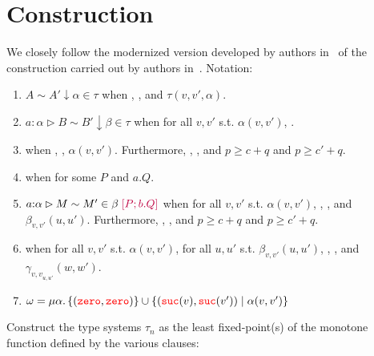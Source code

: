 
\section{Construction}

We closely follow the modernized version developed by authors in~\cite{} of the construction carried out by authors in~\cite{Allen1987ANS}.
Notation:

\begin{enumerate}
  \item $A \sim A' \downarrow \alpha \in \tau$ when , , and 
  $\tau(v,v',\alpha)$.
  \item $a : \alpha \rhd B \sim B' \downarrow \beta \in \tau$ when 
  for all $v,v'$ s.t. $\alpha(v,v')$, .
\item {} when , , 
  $\alpha(v,v')$. 
    Furthermore, , , and 
    $p \ge c + q$ and $p \ge c' + q$.
  \item {} when  for some 
    $P$ and $a.Q$. 
  \item $a {:} \alpha \rhd M \sim M' \in \beta\; {\color{purple}{[P; b.Q]}}$ when 
  for all $v,v'$ s.t. $\alpha(v,v')$, 
    , , and 
    $\beta_{v,v'}(u,u')$.
    Furthermore, , , and 
    $p \ge c + q$ and $p \ge c' + q$.
\item {} when 
  for all $v,v'$ s.t. $\alpha(v,v')$, 
  for all $u,u'$ s.t. $\beta_{v,v'}(u,u')$, 
  , , and $\gamma_{{v,v}_{u,u'}}(w,w')$.
  \item $\omega = \mu \alpha.\, \{({\color{red}{\mathtt{zero}}},{\color{red}{\mathtt{zero}}})\} \cup \{({\color{red}{\mathtt{suc}}}(v),{\color{red}{\mathtt{suc}}}(v')) \mid \alpha(v,v')\}$
\end{enumerate}

Construct the type systems $\tau_n$ as the least fixed-point(s) of the 
monotone function defined by the various clauses: 

